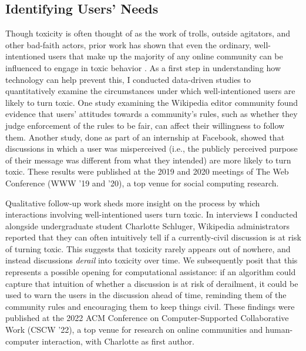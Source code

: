 \documentclass[12pt,letterpaper]{article}
\begin{document}
\subsection{Identifying Users' Needs}
Though toxicity is often thought of as the work of trolls, outside agitators, and other bad-faith actors, prior work has shown that even the ordinary, well-intentioned users that make up the majority of any online community can be influenced to engage in toxic behavior \cite{cheng_anyone_2017}.
As a first step in understanding how technology can help prevent this, I conducted data-driven studies to quantitatively examine the circumstances under which well-intentioned users are likely to turn toxic.
One study examining the Wikipedia editor community found evidence that users' attitudes towards a community's rules, such as whether they judge enforcement of the rules to be fair, can affect their willingness to follow them.
Another study, done as part of an internship at Facebook, showed that discussions in which a user was misperceived (i.e., the publicly perceived purpose of their message was different from what they intended) are more likely to turn toxic.
These results were published at the 2019 \cite{chang_trajectories_2019} and 2020 \cite{chang_dont_2020} meetings of The Web Conference (WWW '19 and '20), a top venue for social computing research.

Qualitative follow-up work sheds more insight on the process by which interactions involving well-intentioned users turn toxic.
In interviews I conducted alongside undergraduate student Charlotte Schluger, Wikipedia administrators reported that they can often intuitively tell if a currently-civil discussion is at risk of turning toxic.
This suggests that toxicity rarely appears out of nowhere, and instead discussions \emph{derail} into toxicity over time.
We subsequently posit that this represents a possible opening for computational assistance: if an algorithm could capture that intuition of whether a discussion is at risk of derailment, it could be used to warn the users in the discussion ahead of time, reminding them of the community rules and encouraging them to keep things civil.
These findings were published at the 2022 ACM Conference on Computer-Supported Collaborative Work (CSCW '22), a top venue for research on online communities and human-computer interaction, with Charlotte as first author.
\end{document}
